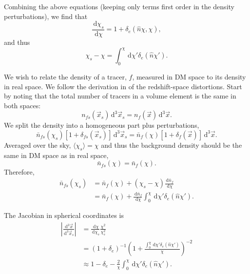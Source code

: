 \documentclass[twocolumn,prl,nofootinbib,floatfix]{revtex4-1}
\newcommand{\ud}{\,\mathrm{d}}
\begin{document}
Combining the above equations (keeping only terms first order in the density
perturbations), we find that
\begin{equation}
\frac{\ud \chi_s}{\ud \chi} = 1 + \delta_e(\hat n \chi, \chi),
\end{equation}
and thus
\begin{equation}
\chi_s - \chi = \int_0^\chi \ud \chi' \delta_e(\hat n \chi').
\end{equation}

We wish to relate the density of a tracer, $f$, measured in DM space to its
density in real space. We follow the derivation in \citet{1987MNRAS.227....1K}
of the
redshift-space distortions. Start by noting that the total number of tracers
in a volume element is the same in both spaces:
\begin{equation}
\label{e:density}
n_{fs}(\vec x_s) \ud^3\vec x_s = n_{f}(\vec x) \ud^3\vec x.
\end{equation}
We split the density into a homogeneous part plus perturbations,
\begin{equation}
    \bar{n}_{fs}(\chi_s)\left[ 1 + \delta_{fs}(\vec x_s)\right] \ud^3\vec x_s
    = \bar{n}_{f}(\chi)\left[ 1 + \delta_f(\vec x)\right] \ud^3\vec x.
\end{equation}
Averaged over the sky, $\langle \chi_s \rangle = \chi$ and thus the background
density should
be the same in DM space as in real space,
\begin{equation}
\bar{n}_{fs}(\chi) = \bar{n}_f(\chi).
\end{equation}
Therefore,
\begin{align}
\bar{n}_{fs}(\chi_s) 
    &= \bar{n}_{f}(\chi) + (\chi_s - \chi)\frac{\ud \bar{n}_f}{\ud \chi}\\
    &= \bar{n}_{f}(\chi)
       + \frac{\ud \bar{n}_f}{\ud \chi}\int_0^\chi \ud \chi' \delta_e(\hat n
       \chi').
       \label{e:nfs}
\end{align}

The Jacobian in spherical coordinates is
\begin{align}
\left| \frac{\ud^3\vec x}{\ud^3\vec x_s} \right|
    &= \frac{\ud \chi}{\ud \chi_s}\frac{\chi^2}{\chi_s^2}\\
    &= (1 + \delta_e)^{-1}
       \left(1 + \frac{\int_0^\chi \ud \chi' \delta_e(\hat n \chi')}
                      {\chi}\right)^{-2}\\
    &\approx 1 - \delta_e
        - \frac{2}{\chi}\int_0^\chi \ud \chi' \delta_e(\hat n \chi').
        \label{e:jac}
\end{align}
\end{document}

